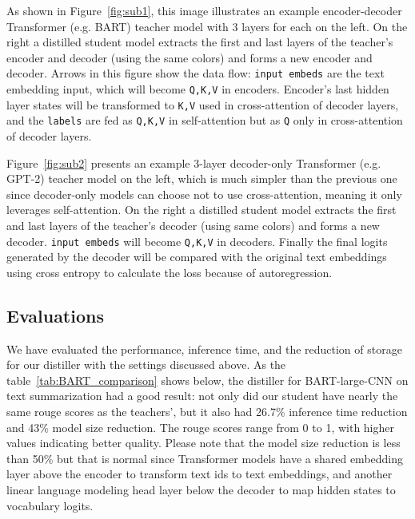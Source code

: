 \documentclass{article}
\begin{document}
    \hspace*{1em} As shown in Figure~\ref{fig:sub1}, this image illustrates an example encoder-decoder Transformer (e.g. BART) teacher model with 3 layers for each on the left. On the right a distilled student model extracts the first and last layers of the teacher's encoder and decoder (using the same colors) and forms a new encoder and decoder. Arrows in this figure show the data flow: \texttt{input embeds} are the text embedding input, which will become \texttt{Q,K,V} in encoders. Encoder's last hidden layer states will be transformed to \texttt{K,V} used in cross-attention of decoder layers, and the \texttt{labels} are fed as \texttt{Q,K,V} in self-attention but as \texttt{Q} only in cross-attention of decoder layers.

    \hspace*{1em} Figure~\ref{fig:sub2} presents an example 3-layer decoder-only Transformer (e.g. GPT-2) teacher model on the left, which is much simpler than the previous one since decoder-only models can choose not to use cross-attention, meaning it only leverages self-attention. On the right a distilled student model extracts the first and last layers of the teacher's decoder (using same colors) and forms a new decoder. \texttt{input embeds} will become \texttt{Q,K,V} in decoders. Finally the final logits generated by the decoder will be compared with the original text embeddings using cross entropy to calculate the loss because of autoregression.

    \subsection{Evaluations}

    \hspace*{1em} We have evaluated the performance, inference time, and the reduction of storage for our distiller with the settings discussed above. As the table~\ref{tab:BART_comparison} shows below, the distiller for BART-large-CNN on text summarization had a good result: not only did our student have nearly the same rouge scores as the teachers', but it also had 26.7\% inference time reduction and 43\% model size reduction. The rouge scores range from 0 to 1, with higher values indicating better quality. Please note that the model size reduction is less than 50\% but that is normal since Transformer models have a shared embedding layer above the encoder to transform text ids to text embeddings,  %
    and another linear language modeling head layer below the decoder to map hidden states to vocabulary logits. %
\end{document}
